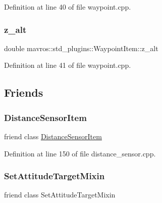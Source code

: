 Definition at line 40 of file waypoint.\+cpp.

\mbox{\label{group__plugin_ga6f6da6509e38cfdd28e62615625504dd}} 
\subsubsection{\texorpdfstring{z\_alt}{z\_alt}}
{\footnotesize\ttfamily double mavros\+::std\+\_\+plugins\+::\+Waypoint\+Item\+::z\+\_\+alt}



Definition at line 41 of file waypoint.\+cpp.



\subsection{Friends}
\mbox{\label{group__plugin_ga4926c3f115f5d91d3b0e1bdbffa71d18}} 
\subsubsection{\texorpdfstring{DistanceSensorItem}{DistanceSensorItem}}
{\footnotesize\ttfamily friend class \mbox{\hyperlink{classmavros_1_1extra__plugins_1_1DistanceSensorItem}{Distance\+Sensor\+Item}}\hspace{0.3cm}{\ttfamily [friend]}}



Definition at line 150 of file distance\+\_\+sensor.\+cpp.

\mbox{\label{group__plugin_ga1d68f99fc6ccc3d89d32bd54885749f7}} 
\subsubsection{\texorpdfstring{SetAttitudeTargetMixin}{SetAttitudeTargetMixin}\hspace{0.1cm}{\footnotesize\ttfamily [1/2]}}
{\footnotesize\ttfamily friend class Set\+Attitude\+Target\+Mixin\hspace{0.3cm}{\ttfamily [friend]}}



